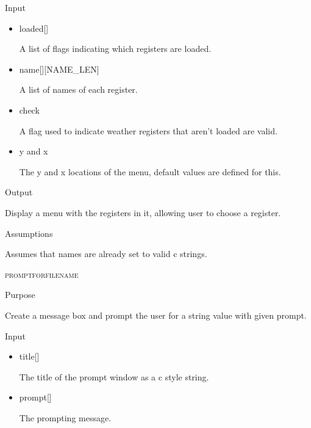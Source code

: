 \documentclass[pdftex, 11pt]{article}
\begin{document}
\begin{description}
\begin{description}
			\item{Input}

				\begin{itemize}

					\item{loaded[]}

						A list of flags indicating which registers are loaded.

					\item{name[][NAME\_LEN]}

						A list of names of each register.

					\item{check}

						A flag used to indicate weather registers that aren't loaded are valid.

					\item{y and x}

						The y and x locations of the menu, default values are defined for this.

				\end{itemize}

			\item{Output}
				
				Display a menu with the registers in it, allowing user to
				choose a register.

			\item{Assumptions}

				Assumes that names are already set to valid c strings.

		\end{description}



	\item{\textsc{promptforfilename}}
		\begin{description}
			\item{Purpose}

				Create a message box and prompt the user for a string value with given prompt.

			\item{Input}

				\begin{itemize}

					\item{title[]}

						The title of the prompt window as a c style string.

					\item{prompt[]}

						The prompting message.


\end{itemize}
\end{description}
\end{description}
\end{document}
